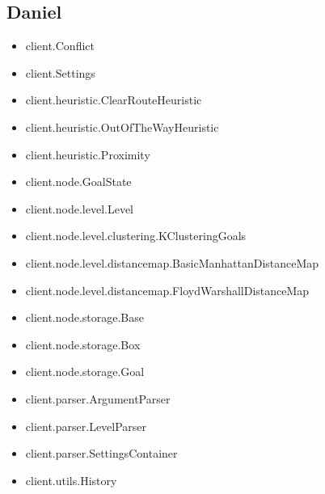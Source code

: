 \documentclass[10pt,a4paper]{article}
\begin{document}
	\subsection{Daniel}
		\begin{itemize}
			\item client.Conflict
	 		\item client.Settings
	 		\item client.heuristic.ClearRouteHeuristic
	 		\item client.heuristic.OutOfTheWayHeuristic
	 		\item client.heuristic.Proximity
	 		\item client.node.GoalState
	 		\item client.node.level.Level
	 		\item client.node.level.clustering.KClusteringGoals
	 		\item client.node.level.distancemap.BasicManhattanDistanceMap
	 		\item client.node.level.distancemap.FloydWarshallDistanceMap
	 		\item client.node.storage.Base
	 		\item client.node.storage.Box
	 		\item client.node.storage.Goal
	 		\item client.parser.ArgumentParser
	 		\item client.parser.LevelParser
	 		\item client.parser.SettingsContainer
	 		\item client.utils.History
		\end{itemize}
\end{document}
